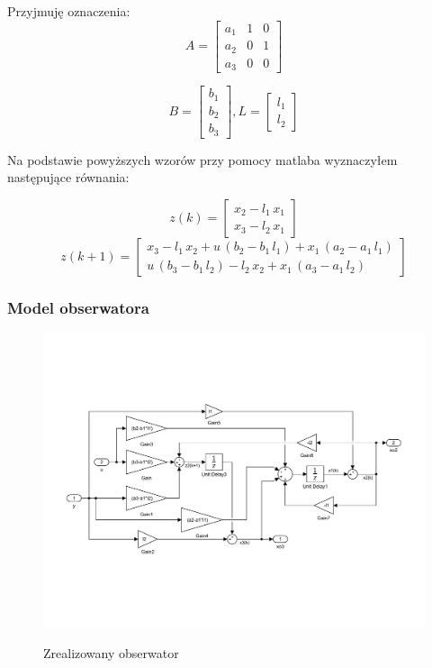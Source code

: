 \documentclass{article}
\begin{document}
Przyjmuję oznaczenia:
$$
A=\left[\begin{array}{ccc} a_{1} & 1 & 0\\ a_{2} & 0 & 1\\ a_{3} & 0 & 0 \end{array}\right]
$$

$$
B=\left[\begin{array}{c} b_{1}\\ b_{2}\\ b_{3} \end{array}\right], L=\left[\begin{array}{c} l_{1}\\ l_{2} \end{array}\right]
$$

Na podstawie powyższych wzorów przy pomocy matlaba wyznaczyłem następujące równania:

$$
z(k)=\left[\begin{array}{c} x_{2}-l_{1}\,x_{1}\\ x_{3}-l_{2}\,x_{1} \end{array}\right]
$$
$$
z(k+1)=\left[\begin{array}{c} x_{3}-l_{1}\,x_{2}+u\,\left(b_{2}-b_{1}\,l_{1}\right)+x_{1}\,\left(a_{2}-a_{1}\,l_{1}\right)\\ u\,\left(b_{3}-b_{1}\,l_{2}\right)-l_{2}\,x_{2}+x_{1}\,\left(a_{3}-a_{1}\,l_{2}\right) \end{array}\right]
$$

\subsubsection{Model obserwatora}
\begin{figure}[H]
\includegraphics[clip, trim=0cm 4cm 0cm 4cm, width=1.00\textwidth]{../rys/zad4_obserwator.pdf}
\label{fig:zad4obs}
\caption{Zrealizowany obserwator}
\end{figure}
\newpage
\end{document}
